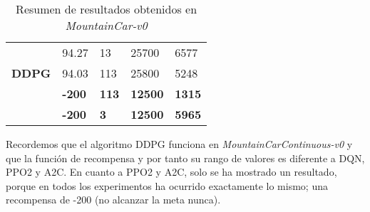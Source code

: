 \documentclass[11pt,fleqn]{book} %
\begin{document}
\begin{table}[H]
\begin{tabular}{l|l|l|l|l|}
		\multicolumn{1}{|l|}{\cellcolor[HTML]{C7DCB4}}                                & 94.27                                                                                                                          & 13                                                                                   & 25700                                                                                                                    & 6577                                              \\ \cline{2-5} 
		\multicolumn{1}{|l|}{\multirow{-3}{*}{\cellcolor[HTML]{C7DCB4}\textbf{DDPG}}} & 94.03                                                                                                                          & 113                                                                                  & 25800                                                                                                                    & 5248                                              \\ \hline
		\rowcolor[HTML]{FFCCC9} 
		\multicolumn{1}{|l|}{\cellcolor[HTML]{C7DCB4}\textbf{PPO2}}                   & \textbf{-200}                                                                                                                  & \textbf{113}                                                                         & \textbf{12500}                                                                                                           & \textbf{1315}                                     \\ \hline
		\rowcolor[HTML]{FFCCC9} 
		\multicolumn{1}{|l|}{\cellcolor[HTML]{C7DCB4}\textbf{A2C}}                    & \textbf{-200}                                                                                                                  & \textbf{3}                                                                           & \textbf{12500}                                                                                                           & \textbf{5965}                                     \\ \hline
	\end{tabular}
	\caption{Resumen de resultados obtenidos en \textit{MountainCar-v0}}
	\label{table:resultadosMountain}
\end{table}

Recordemos que el algoritmo DDPG funciona en \textit{MountainCarContinuous-v0} y que la función de recompensa y por tanto su rango de valores es diferente a DQN, PPO2 y A2C. En cuanto a PPO2 y A2C, solo se ha mostrado un resultado, porque en todos los experimentos ha ocurrido exactamente lo mismo; una recompensa de -200 (no alcanzar la meta nunca).\\
\end{document}
